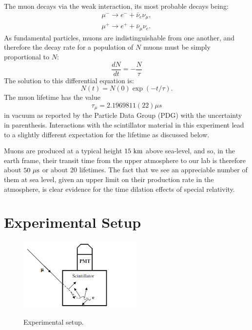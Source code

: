 The muon decays via the weak interaction, its most probable decays being:
\begin{eqnarray*}
\mu^- \to e^- + \bar{\nu}_e \nu_\mu,\\
\mu^+ \to e^+ + \bar{\nu}_\mu \nu_e.
\end{eqnarray*}
As fundamental particles, muons are indistinguishable from one
another, and therefore the decay rate for a population of $N$ muons
must be simply proportional to $N$:
\begin{displaymath}
\frac{dN}{dt} = -\frac{N}{\tau}
\end{displaymath}
The solution to this differential equation is:
\begin{displaymath}
N(t) = N(0) \exp(-t/\tau).
\end{displaymath}
The muon lifetime has the value 
\begin{displaymath}
\tau_\mu = 2.1969811(22) \mu s
\end{displaymath}
in vacuum as reported by the Particle Data Group (PDG) with the
uncertainty in parenthesis.  Interactions with the scintillator
material in this experiment lead to a slightly different expectation
for the lifetime as discussed below.

Muons are produced at a typical height $15~\rm km$ above sea-level,
and so, in the earth frame, their transit time from the upper
atmosphere to our lab is therefore about $50~\rm \mu s$ or about 20
lifetimes.  The fact that we see an appreciable number of them at sea
level, given an upper limit on their production rate in the
atmosphere, is clear evidence for the time dilation effects of special
relativity.

\section{Experimental Setup}

\begin{figure}[htbp]
\begin{center}
{\includegraphics[width=0.55\textwidth]{figs/labs/muon/setup.png}}\\
\end{center}
\caption{\label{fig:setup}  Experimental setup.}\end{figure}

